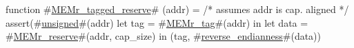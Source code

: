 function #\hyperref[zMEMrzytaggedzyreserve]{MEMr\_tagged\_reserve}# (addr) =
{
  /* assumes addr is cap. aligned */
  assert(#\hyperref[zunsigned]{unsigned}#(addr) %
  let tag = #\hyperref[zMEMrzytag]{MEMr\_tag}#(addr) in
  let data = #\hyperref[zMEMrzyreserve]{MEMr\_reserve}#(addr, cap_size) in
  (tag, #\hyperref[zreversezyendianness]{reverse\_endianness}#(data))
}
